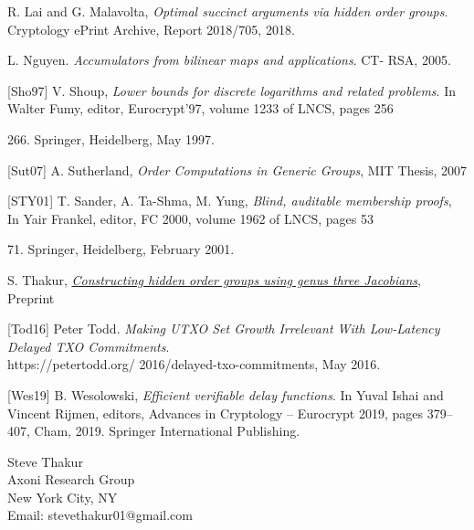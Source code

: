 \documentclass[11pt, lettersize, notitlepage, leqno, footskip=0.6cm]{article}
\newcommand{\noin}{\noindent}
\numberwithin{equation}{section}
\begin{document}
\noin [LM18] R. Lai and G. Malavolta,  \textit{Optimal succinct arguments via hidden order groups}. Cryptology ePrint Archive, Report 2018/705, 2018. \vspace{0.1cm}

\noin [Ngu05] L. Nguyen. \textit{Accumulators from bilinear maps and applications}. CT-
RSA, 2005. \vspace{0.1cm}

\noin \hypertarget{Sho97}{[Sho97]} V. Shoup, \textit{Lower bounds for discrete logarithms and related problems}. In Walter Fumy, editor, Eurocrypt'97, volume 1233 of LNCS, pages 256{266. Springer, Heidelberg, May 1997. \vspace{0.1cm}

\noindent \hypertarget{Sut07}{[Sut07]} A. Sutherland, \textit{Order Computations in Generic Groups}, MIT Thesis, 2007 \vspace{0.1cm}

\noindent \hypertarget{STY01}{[STY01]} T. Sander, A. Ta-Shma, M. Yung, \textit{Blind, auditable membership proofs}, In Yair Frankel, editor, FC 2000, volume 1962 of LNCS, pages 53{71. Springer, Heidelberg, February 2001.\vspace{0.1cm}


\noindent [Th20] S. Thakur, \href{https://eprint.iacr.org/2020/348}{\textit{Constructing hidden order groups using genus three Jacobians}}, Preprint \vspace{0.1cm} 

\noin \hypertarget{Tod16}{[Tod16]} Peter Todd. \textit{Making UTXO Set Growth Irrelevant With Low-Latency Delayed TXO Commitments}.\\ https://petertodd.org/
2016/delayed-txo-commitments, May 2016.\vspace{0.1cm}

\noindent \hypertarget{Wes18}{[Wes19]} B. Wesolowski, \textit{Efficient verifiable delay functions}. In Yuval Ishai and Vincent Rijmen, editors, Advances in Cryptology – Eurocrypt 2019, pages 379–407, Cham, 2019. Springer International Publishing.\vspace{0.1cm}




\bigskip

\normalsize

\noindent Steve Thakur\\
Axoni Research Group\\
New York City, NY\\
Email: stevethakur01@gmail.com 


}}
\end{document}
